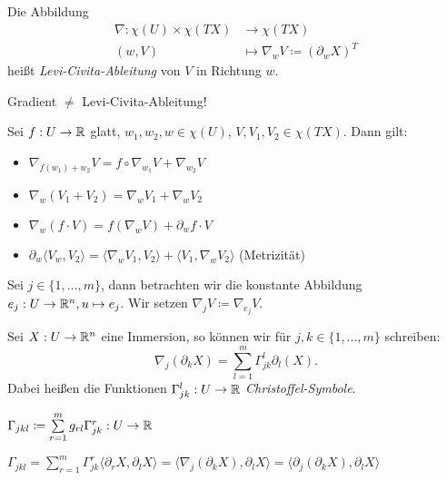 \documentclass{cheat-sheet}
\let\mySum\sum
\DeclareMathOperator*{\textsum}{{\textstyle \mySum}}
\renewcommand{\sum}{\textsum\limits}
\begin{document}
\begin{defn}
  Die Abbildung
  \begin{align*}
    \nabla : \chi(U) \times \chi(TX) &\to \chi(TX) \\
    (w, V) &\mapsto \nabla_w V \coloneqq (\partial_w X)^T
  \end{align*}
  heißt \emph{Levi-Civita-Ableitung} von $V$ in Richtung $w$.
\end{defn}

\begin{acht}
  Gradient $\not=$ Levi-Civita-Ableitung!
\end{acht}

\begin{satz}
  Sei $f : U \to \mathbb{R}$ glatt, $w_1, w_2, w \in \chi(U)$, $V, V_1, V_2 \in \chi(TX)$. Dann gilt:
  \begin{itemize}
    \item $\nabla_{f(w_1) + w_2} V = f \circ \nabla_{w_1} V + \nabla_{w_2} V$
    \item $\nabla_w (V_1 + V_2) = \nabla_w V_1 + \nabla_w V_2$
    \item $\nabla_w (f \cdot V) = f (\nabla_w V) + \partial_w f \cdot V $
    \item $\partial_w \langle V_w, V_2 \rangle = \langle \nabla_w V_1 , V_2 \rangle + \langle V_1 , \nabla_w V_2 \rangle$ (Metrizität)
  \end{itemize}
\end{satz}

\begin{nota}
  Sei $j \in \{1, ..., m\}$, dann betrachten wir die konstante Abbildung $e_j : U \to \mathbb{R}^n, u \mapsto e_j$. Wir setzen $\nabla_j V \coloneqq \nabla_{e_j} V$.
\end{nota}

\begin{defn}
  Sei $X : U \to \mathbb{R}^n$ eine Immersion, so können wir für $j, k \in \{ 1, ..., m\}$ schreiben:
  \[ \nabla_j (\partial_k X) = \sum_{l=1}^m \Gamma_{jk}^l \partial_l (X). \]
  Dabei heißen die Funktionen $\Gamma_{jk}^l : U \to \mathbb{R}$ \emph{Christoffel-Symbole}.
\end{defn}

\begin{nota}
  $\Gamma_{jkl} \coloneqq \sum_{r=1}^m g_{rl} \Gamma_{jk}^r : U \to \R$
\end{nota}

\begin{satz}
  $\Gamma_{jkl}\!=\!\sum_{r=1}^m \Gamma_{jk}^{r} \langle \partial_r X, \partial_l X \rangle\!=\!\langle \nabla_j (\partial_k X), \partial_l X \rangle\!=\!\langle \partial_j (\partial_k X), \partial_l X \rangle$
\end{satz}
\end{document}
